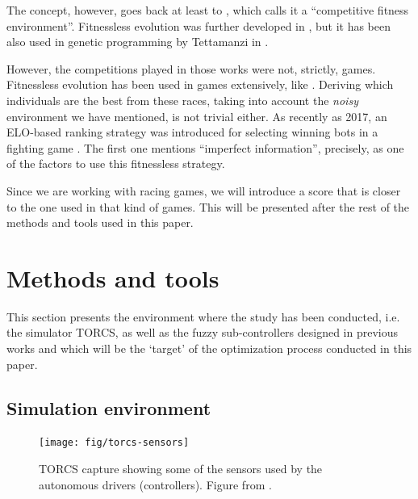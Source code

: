 \documentclass[10pt,journal,compsoc]{IEEEtran}
\begin{document}
The concept, however, goes back at least to
\cite{Angeline:1993:CEE:645513.657590}, which calls it a ``competitive
fitness environment''. Fitnessless evolution was further developed in
\cite{rosin1995methods}, but it has been also used in genetic
programming by Tettamanzi in \cite{tettamanzi1996genetic}.

However, the competitions played in those works were not, strictly,
games. Fitnessless evolution has been used in games extensively, like
\cite{Jaskowski2008,10.1007/978-3-540-78671-9_2,fernandez2016_only_one}.
Deriving which individuals are the best from these races, taking into account
the {\em noisy} environment we have mentioned, is not trivial
either. As recently as 2017, an ELO-based ranking strategy was
introduced for selecting winning bots in a fighting game
\cite{7792145}. The first one mentions ``imperfect information'',
precisely, as one of the factors to use this fitnessless strategy.

Since we are working with racing games, we will introduce a score that
is closer to the one used in that kind of games. This will be
presented after the rest of the methods and tools used in this paper. 



\section{Methods and tools}
\label{sec:methods}

This section presents the environment where the study has been conducted, i.e. the simulator TORCS, as well as the fuzzy sub-controllers designed in previous works and which will be the `target' of the optimization process conducted in this paper. 

%

\subsection{Simulation environment}

\begin{figure}[!ht] 
	\begin{center}
		\texttt{[image: fig/torcs-sensors]}
		\caption {TORCS capture showing some of the sensors
                used by the autonomous drivers (controllers). Figure from \cite{DBLP:conf/cig/SalemMG19}.}
		\label{fig:torcs-sensors}
	\end{center}
\end{figure}
\end{document}
